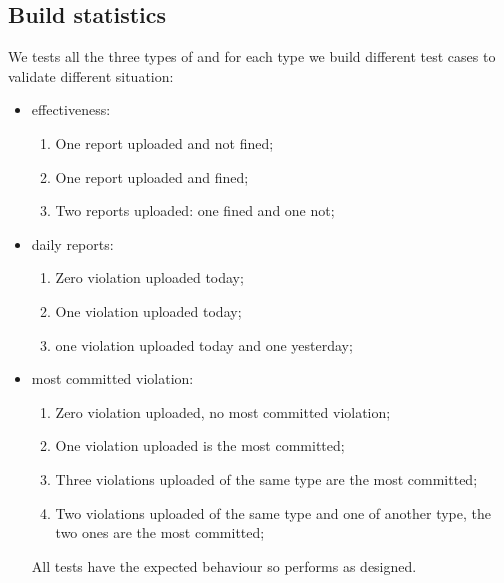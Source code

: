 \documentclass[../ITD.tex]{subfiles}
\begin{document}
    \subsection{Build statistics}\label{subsec:build-statistics}
    We tests all the three types of and for each type we build different test cases to validate different situation:
    \begin{itemize}
        \item effectiveness:
        \begin{enumerate}
            \item One report uploaded and not fined;
            \item One report uploaded and fined;
            \item Two reports uploaded: one fined and one not;
        \end{enumerate}
        \item daily reports:
        \begin{enumerate}
            \item Zero violation uploaded today;
            \item One violation uploaded today;
            \item one violation uploaded today and one yesterday;
        \end{enumerate}
        \item most committed violation:
        \begin{enumerate}
            \item Zero violation uploaded, no most committed violation;
            \item One violation uploaded is the most committed;
            \item Three violations uploaded of the same type are the most committed;
            \item Two violations uploaded of the same type and one of another type, the two ones are the most committed;
        \end{enumerate}
        All tests have the expected behaviour so performs as designed.
    \end{itemize}
\end{document}
